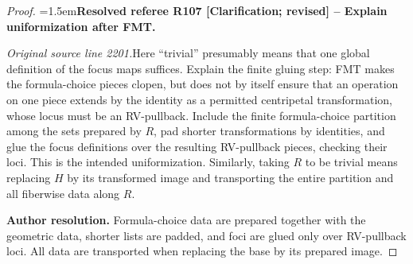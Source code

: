 \documentclass[12pt]{amsart}
\newcommand{\ResolvedRefereeRemark}[5]{%
  \par\medskip\begingroup\normalfont\small\color{gray}%
  \emergencystretch=1.5em\noindent\textbf{Resolved referee R#1 [#2] -- #3.}\par\nobreak\noindent #4\par
  \medskip\color{ResolutionGreen}\noindent\textbf{Author resolution.} #5\par
  \endgroup\medskip
}
\theoremstyle{plain}
\theoremstyle{definition}
\theoremstyle{remark}
\numberwithin{equation}{section}
\theoremstyle{plain}
\newcommand{\0}{\emptyset}
\begin{document}
\begin{proof}
\ResolvedRefereeRemark{107}{Clarification; revised}{Explain uniformization after FMT}{%
\textit{Original source line 2201.}\quad Here ``trivial'' presumably means that one global definition of the focus maps suffices. Explain the finite gluing step: FMT makes the formula-choice pieces clopen, but does not by itself ensure that an operation on one piece extends by the identity as a permitted centripetal transformation, whose locus must be an RV-pullback. Include the finite formula-choice partition among the sets prepared by $R$, pad shorter transformations by identities, and glue the focus definitions over the resulting RV-pullback pieces, checking their loci. This is the intended uniformization. Similarly, taking $R$ to be trivial means replacing $H$ by its transformed image and transporting the entire partition and all fiberwise data along $R$.
}{Formula-choice data are prepared together with the geometric data, shorter lists are padded, and foci are glued only over RV-pullback loci. All data are transported when replacing the base by its prepared image.}



\end{proof}
\end{document}
